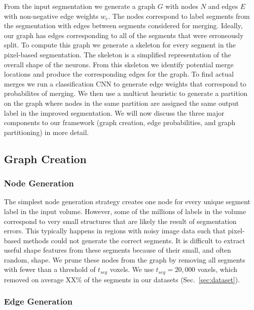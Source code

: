 From the input segmentation we generate a graph $G$ with nodes $N$ and edges $E$ with non-negative edge weights $w_e$. The nodes correspond to label segments from the segmentation with edges between segments considered for merging. Ideally, our graph has edges corresponding to all of the segments that were erroneously split. To compute this graph we generate a skeleton for every segment in the pixel-based segmentation. The skeleton is a simplified representation of the overall shape of the neurons. From this skeleton we  identify potential merge locations and produce the corresponding edges for the graph. To find actual merges we run a classification CNN to generate edge weights that correspond to probabilites of merging. We then use a multicut heuristic to generate a partition on the graph where nodes in the same partition are assigned the same output label in the improved segmentation. We will now discuss the three major components to our framework (graph creation, edge probabilities, and graph partitioning) in more detail.

\subsection{Graph Creation}
\label{sec:skeletonization}


\subsubsection{Node Generation}

The simplest node generation strategy creates one node for every unique segment label in the input volume. However, some of the millions of labels in the volume correspond to very small structures that are likely the result of segmentation errors. This typically happens in regions with noisy image data such that pixel-based methods could not generate the correct segments. It is difficult to extract useful shape features from these segments because of their small, and often random, shape. We prune these nodes from the graph by removing all segments with fewer than a threshold of $t_{seg}$ voxels. We use $t_{seg} = 20,000$ voxels, which removed on average XX\%  of the segments in our  datasets (Sec.~\ref{sec:dataset}).

\subsubsection{Edge Generation}

